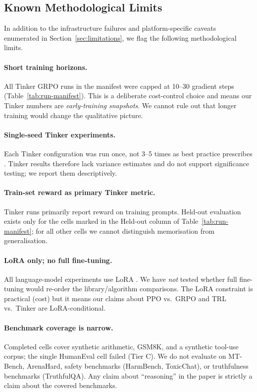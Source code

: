 \subsection{Known Methodological Limits}
\label{sec:methodlimits}

In addition to the infrastructure failures and platform-specific caveats
enumerated in Section~\ref{sec:limitations}, we flag the following
methodological limits.

\paragraph{Short training horizons.}
All Tinker GRPO runs in the manifest were capped at 10--30 gradient steps
(Table~\ref{tab:run-manifest}). This is a deliberate cost-control choice and
means our Tinker numbers are \emph{early-training snapshots}. We cannot rule
out that longer training would change the qualitative picture.

\paragraph{Single-seed Tinker experiments.}
Each Tinker configuration was run once, not 3--5 times as best practice
prescribes \cite{henderson2018deep}. Tinker results therefore lack
variance estimates and do not support significance testing; we report
them descriptively.

\paragraph{Train-set reward as primary Tinker metric.}
Tinker runs primarily report reward on training prompts. Held-out
evaluation exists only for the cells marked in the Held-out column of
Table~\ref{tab:run-manifest}; for all other cells we cannot distinguish
memorisation from generalisation.

\paragraph{LoRA only; no full fine-tuning.}
All language-model experiments use LoRA \cite{hu2022lora}. We have
\emph{not} tested whether full fine-tuning would re-order the
library/algorithm comparisons. The LoRA constraint is practical (cost) but
it means our claims about PPO vs.\ GRPO and TRL vs.\ Tinker are
LoRA-conditional.

\paragraph{Benchmark coverage is narrow.}
Completed cells cover synthetic arithmetic, GSM8K, and a synthetic
tool-use corpus; the single HumanEval cell failed (Tier C). We do not evaluate on MT-Bench,
ArenaHard, safety benchmarks (HarmBench, ToxicChat), or truthfulness
benchmarks (TruthfulQA). Any claim about ``reasoning'' in the paper is
strictly a claim about the covered benchmarks.

